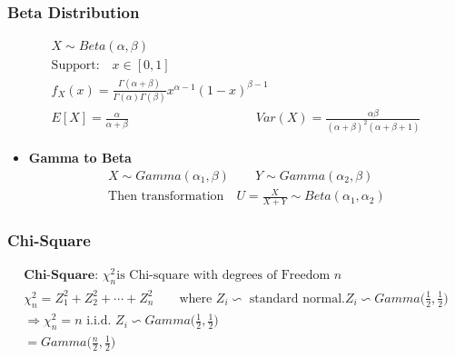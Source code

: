 \subsubsection*{Beta Distribution}
\begin{tcolorbox}
\begin{gather*}
	X \sim Beta(\alpha, \beta)\\
	\text{Support:} \quad x \in [0, 1]\\
	f_X(x) = \frac{\Gamma(\alpha + \beta)}{\Gamma(\alpha) \Gamma(\beta)} x^{\alpha - 1} (1 - x)^{\beta - 1}\\
	E[X] = \frac{\alpha}{\alpha + \beta} \hspace{10em} Var(X) = \frac{\alpha \beta}{(\alpha + \beta)^2(\alpha + \beta + 1)}
\end{gather*}	
\end{tcolorbox}
\begin{itemize}
	\item \textbf{Gamma to Beta}
	\begin{gather*}
		X \sim Gamma(\alpha_1, \beta) \qquad Y \sim Gamma(\alpha_2, \beta)\\
		\text{Then transformation} \quad U = \frac{X}{X+Y} \sim Beta(\alpha_1, \alpha_2) \tag{Use $X = UV$, $Y = V - UV$}
	\end{gather*}
\end{itemize}
\subsubsection*{Chi-Square}
\begin{gather*}
	\textbf{Chi-Square: } \chi^2_n \text{is Chi-square with degrees of Freedom }n\\
	\chi^2_n = Z_1^2 + Z_2^2 + \cdots + Z_n^2 \quad \quad \text{where $Z_i \backsim$ standard normal}. Z_i \backsim Gamma\bigg(\frac{1}{2},\frac{1}{2}\bigg)\\
	\Rightarrow \chi^2_n = n \text{ i.i.d. } Z_i \backsim Gamma\bigg(\frac{1}{2},\frac{1}{2}\bigg)\\
	= Gamma\bigg(\frac{n}{2},\frac{1}{2}\bigg)
\end{gather*}
